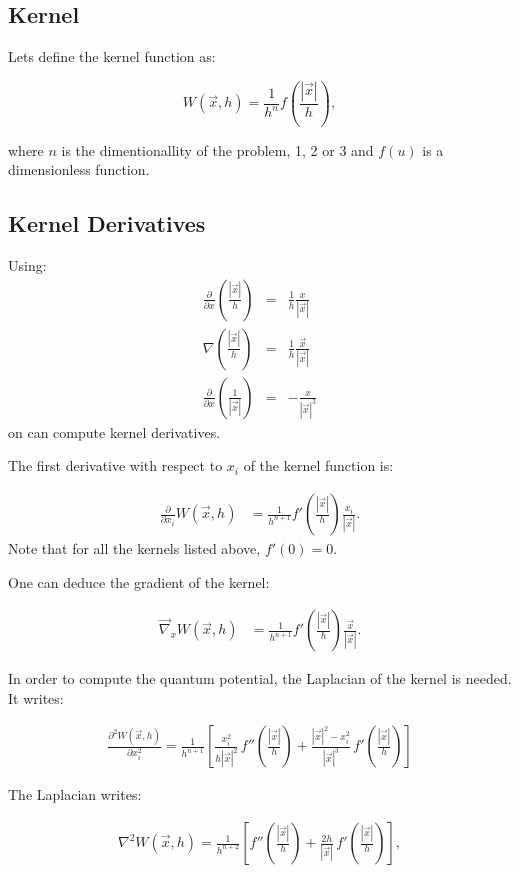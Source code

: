 
\subsection{Kernel}

Lets define the kernel function as:

\begin{equation}
W(\vec{x},h) = \frac{1}{h^n} f\left(\frac{|\vec{x}|}{h}\right),
\end{equation}

where $n$ is the dimentionallity of the problem, 1, 2 or 3 and
$f(u)$ is a dimensionless function.

\subsection{Kernel Derivatives}

Using:
\begin{eqnarray}
  \frac{\partial}{\partial x} \left(\frac{|\vec{x}|}{h}\right) & = & \frac{1}{h}\frac{x}{|\vec{x}|} \\
  \nabla\left(\frac{|\vec{x}|}{h}\right) & = & \frac{1}{h}\frac{\vec{x}}{|\vec{x}|} \\
   \frac{\partial}{\partial x} \left( \frac{1}{|\vec{x}|} \right) & = & -\frac{x}{|\vec{x}|^3} 
\end{eqnarray}
on can compute kernel derivatives.

\noindent

The first derivative with respect to $x_i$ of the kernel function is:

\begin{align}
\frac{\partial}{\partial x_i} W(\vec{x},h) &= \frac{1}{h^{n+1}}f'\left(\frac{|\vec{x}|}{h}\right) \frac{x_i}{|\vec{x}|}.
\end{align}
Note that for all the kernels listed above, $f'(0) = 0$. 

One can deduce the gradient of the kernel:

\begin{align}
 \vec\nabla_x W(\vec{x},h) &= \frac{1}{h^{n+1}}f'\left(\frac{|\vec{x}|}{h}\right) \frac{\vec{x}}{|\vec{x}|}.
\end{align}

\noindent
In order to compute the quantum potential, the Laplacian of the kernel is needed. It writes:

\begin{align}
\frac{\partial^2 W(\vec{x},h)}{\partial x_i^2}
= \frac{1}{h^{n+1}} \left[
\frac{x_i^2}{h |\vec{x}|^2}\, f''\!\left(\frac{|\vec{x}|}{h}\right) +
\frac{|\vec{x}|^2 - x_i^2}{|\vec{x}|^3}\,f'\!\left(\frac{|\vec{x}|}{h}\right)\right]
\end{align}

\noindent
The Laplacian writes:


\begin{align}
\nabla^2 W(\vec{x},h)
= \frac{1}{h^{n+2}}
\left[
f''\!\left(\frac{|\vec{x}|}{h}\right)
+ \frac{2h}{|\vec{x}|}\,
f'\!\left(\frac{|\vec{x}|}{h}\right)
\right],
\end{align}





